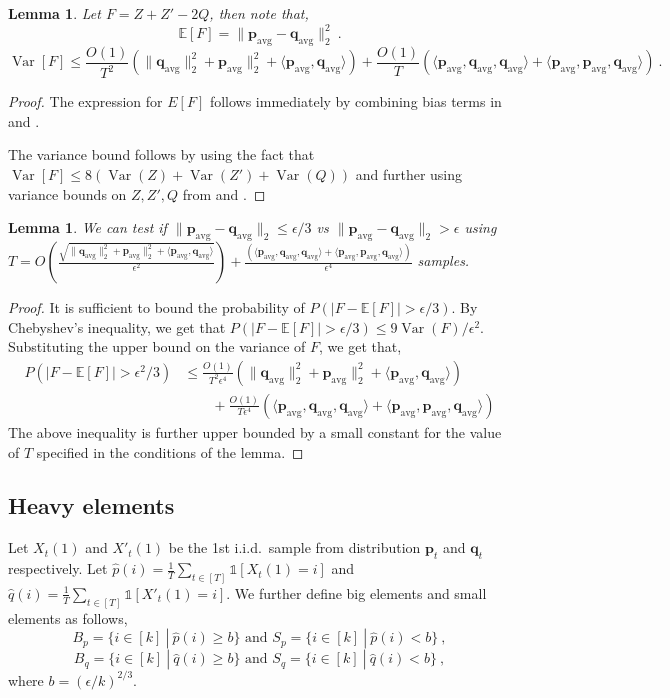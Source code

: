 \documentclass[10pt]{article} %
\newcommand{\E}{\mathbb{E}}
\theoremstyle{plain}
\newtheorem{lemma}[theorem]{Lemma}
\newcommand{\bp}{\textbf{p}}
\newcommand{\bq}{\textbf{q}}
\newcommand{\avg}{\mathrm{avg}}
\newcommand{\Var}{\operatorname{{Var}}}
\begin{document}
\begin{lemma}
	Let $F = Z+Z'-2Q$, then note that,
	$$\E[F] = \|\bp_{\avg} - \bq_{\avg}\|_2^2~.$$
	$$\Var[F]  \leq \frac{O(1)}{T^2}(\|\bq_{\avg}\|_2^2 + \bp_{\avg}\|_2^2 + \langle \bp_{\avg},\bq_{\avg} \rangle) + \frac{O(1)}{T}(\langle \bp_{\avg}, \bq_{\avg}, \bq_{\avg} \rangle + \langle \bp_{\avg}, \bp_{\avg}, \bq_{\avg} \rangle)~.$$
\end{lemma}
\begin{proof}
	The expression for $E[F]$ follows immediately by combining bias terms in  and . 
	
	The variance bound follows by using the fact that $\Var[F] \leq 8(\Var(Z) +\Var(Z') + \Var(Q))$ and further using variance bounds on $Z,Z',Q$ from  and .
\end{proof}


\begin{lemma}\label{lem:l2tester}
	We can test if $\|\bp_{\avg} - \bq_{\avg}\|_2 \leq \epsilon/3$ vs $\|\bp_{\avg} - \bq_{\avg}\|_2 > \epsilon $ using $T=O(\frac{\sqrt{\|\bq_{\avg}\|_2^2 + \bp_{\avg}\|_2^2 + \langle \bp_{\avg},\bq_{\avg} \rangle}}{\epsilon^2}) + \frac{(\langle \bp_{\avg}, \bq_{\avg}, \bq_{\avg} \rangle + \langle \bp_{\avg}, \bp_{\avg}, \bq_{\avg} \rangle)}{\epsilon^4}$ samples.
\end{lemma}
\begin{proof}
	It is sufficient to bound the probability of $P(|F-\E[F]| > \epsilon/3)$. By Chebyshev's inequality, we get that $P(|F-\E[F]| > \epsilon/3) \leq 9\Var(F)/\epsilon^2$. Substituting the upper bound on the variance of $F$, we get that,
	\begin{align*}
		P(|F-\E[F]| > \epsilon^2/3) &  \leq \frac{O(1)}{ T^2\epsilon^4}(\|\bq_{\avg}\|_2^2 + \bp_{\avg}\|_2^2 + \langle \bp_{\avg},\bq_{\avg} \rangle) \\
		&\qquad+ \frac{O(1)}{T\epsilon^4}(\langle \bp_{\avg}, \bq_{\avg}, \bq_{\avg} \rangle + \langle \bp_{\avg}, \bp_{\avg}, \bq_{\avg} \rangle)
	\end{align*}
	The above inequality is further upper bounded by a small constant for the value of $T$ specified in the conditions of the lemma.
\end{proof}

\subsection{Heavy elements}

Let $X_t(1)$ and $X'_t(1)$ be the 1st i.i.d.\ sample from distribution $\bp_t$ and $\bq_t$ respectively. Let $\widehat{p}(i) = \frac{1}{T}\sum_{t \in [T]}\mathds{1}[X_t(1) = i]$ and $\widehat{q}(i) = \frac{1}{T}\sum_{t \in [T]}\mathds{1}[X'_t(1) = i]$. We further define big elements and small elements as follows,
$$B_{p}= \{i \in [k]~|~ \widehat{p}(i) \geq b\} \text{ and } S_{p}= \{i \in [k]~|~ \widehat{p}(i) < b\}~,$$
$$B_{q}= \{i \in [k]~|~ \widehat{q}(i) \geq b\} \text{ and } S_{q}= \{i \in [k]~|~ \widehat{q}(i) < b\}~,$$
where $b= (\epsilon/k)^{2/3}$.
\end{document}
